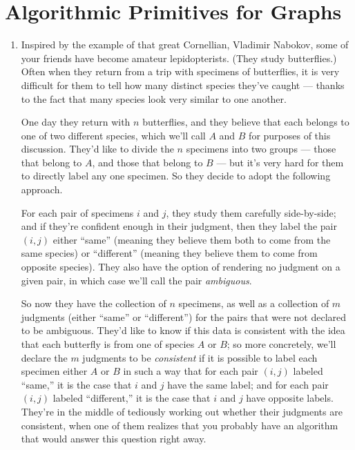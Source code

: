 \documentclass[12pt]{article}
\begin{document}
\section{Algorithmic Primitives for Graphs}


\begin{enumerate}


\item

Inspired by the example of that great Cornellian, Vladimir Nabokov,
some of your friends have become amateur lepidopterists.
(They study butterflies.)
Often when they return from a trip with specimens of butterflies,
it is very difficult for them to tell how many distinct species
they've caught --- thanks to the fact that many species look very similar
to one another.

One day they return with $n$ butterflies, and they believe
that each belongs to one of two different species,
which we'll call $A$ and $B$ for purposes of this discussion.
They'd like to divide the $n$ specimens into two groups ---
those that belong to $A$, and those that belong to $B$ ---
but it's very hard for them to directly label any one specimen.
So they decide to adopt the following approach.

For each pair of specimens $i$ and $j$, they study them
carefully side-by-side; and if they're confident enough
in their judgment, then they label the pair $(i,j)$
either ``same'' (meaning they believe them both to come from the
same species) or ``different'' (meaning they believe them to
come from opposite species).
They also have the option of rendering no judgment on a given
pair, in which case we'll call the pair {\em ambiguous}.

So now they have the collection of $n$ specimens, as well
as a collection of $m$ judgments (either ``same'' or ``different'')
for the pairs that were not declared to be ambiguous.
They'd like to know if this data is consistent with the
idea that each butterfly is from one of species $A$ or $B$;
so more concretely, we'll declare the $m$ judgments to be
{\em consistent} if it is possible to label each specimen either $A$ or $B$
in such a way that for each pair $(i,j)$ labeled ``same,''
it is the case that $i$ and $j$ have the same label;
and for each pair $(i,j)$ labeled ``different,''
it is the case that $i$ and $j$ have opposite labels.
They're in the middle of tediously working out whether
their judgments are consistent, when one of them realizes
that you probably have an algorithm that would answer
this question right away.


\end{enumerate}
\end{document}
